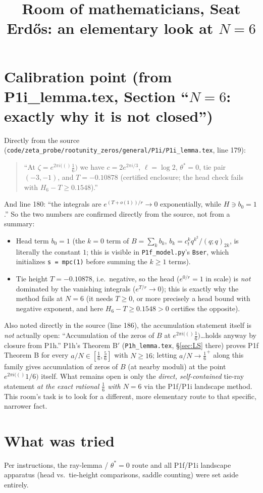 \documentclass[11pt]{article}
\title{Room of mathematicians, Seat Erd\H{o}s: an elementary look at $N=6$}
\author{}
\date{}
\newcommand{\e}[1]{e^{2\pi i(#1)}}
\begin{document}
\maketitle

\section*{Calibration point (from P1i\_lemma.tex, Section ``$N=6$: exactly why it is not closed'')}
Directly from the source (\texttt{code/zeta\_probe/rootunity\_zeros/general/P1i/P1i\_lemma.tex}, line 179):
\begin{quote}
``At $\zeta=\e(\frac16)$ we have $c=2e^{2\pi i/3}$, $\ell=\log2$, $\theta^*=0$, tie pair $(-3,-1)$, and $T=-0.10878$ (certified enclosure; the head check fails with $H_6-T\ge0.1548$).''
\end{quote}
And line 180: ``the integrals are $e^{(T+o(1))/r}\to0$ exponentially, while $H\ni b_0=1$.'' So the two numbers are confirmed directly from the source, not from a summary:
\begin{itemize}
\item Head term $b_0=1$ (the $k=0$ term of $B=\sum_k b_k$, $b_k=c_t^kq^{k^2}/(q;q)_{2k}$, is literally the constant $1$; this is visible in \texttt{P1f\_model.py}'s \texttt{Bser}, which initializes \texttt{s = mpc(1)} before summing the $k\ge1$ terms).
\item Tie height $T=-0.10878$, i.e.\ negative, so the head ($e^{0/r}=1$ in scale) is \emph{not} dominated by the vanishing integrals ($e^{T/r}\to0$); this is exactly why the method fails at $N=6$ (it needs $T\ge0$, or more precisely a head bound with negative exponent, and here $H_6-T\ge0.1548>0$ certifies the opposite).
\end{itemize}
Also noted directly in the source (line 186), the accumulation statement itself is \emph{not} actually open: ``Accumulation of the zeros of $B$ at $\e(\frac16)$\ldots holds anyway by closure from P1h.'' P1h's Theorem B$'$ (\texttt{P1h\_lemma.tex}, \S\ref{sec:LS} there) proves P1f Theorem B for every $a/N\in[\frac16,\frac56]$ with $N\ge16$; letting $a/N\to\frac16^+$ along this family gives accumulation of zeros of $B$ (at nearby moduli) at the point $\e(1/6)$ itself. What remains open is only the \emph{direct, self-contained} tie-ray statement \emph{at the exact rational $\frac16$ with $N=6$} via the P1f/P1i landscape method. This room's task is to look for a different, more elementary route to that specific, narrower fact.

\section*{What was tried}
Per instructions, the ray-lemma / $\theta^*=0$ route and all P1f/P1i landscape apparatus (head vs.\ tie-height comparisons, saddle counting) were set aside entirely.
\end{document}
